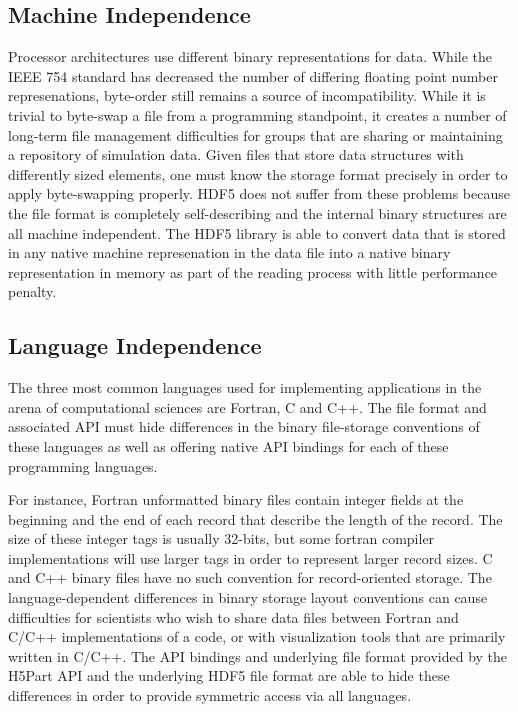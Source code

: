 \documentclass[acus]{JAC2003}
\begin{document}
\subsection{Machine Independence}
Processor architectures use different binary representations
for data.  While the IEEE 754 standard has decreased the number of
differing floating point number represenations, byte-order still remains
a source of incompatibility.  While it is trivial to byte-swap a file from
a programming standpoint, it creates a number of long-term file management
difficulties for groups that are sharing or maintaining a repository of simulation
data.  Given files that store data structures with differently sized elements,
one must know the storage format precisely in order to apply byte-swapping
properly. 
HDF5 does not suffer from these problems because the file format is completely
self-describing and the internal binary structures are all machine independent.
The HDF5 library is able to convert data that is stored in any native machine 
represenation in the data file into a native binary representation in memory 
as part of the reading process with little performance penalty.

\subsection{Language Independence}
The three most common languages used for implementing applications 
in the arena of computational sciences are
Fortran, C and C++. The file format and associated API must hide
differences in the binary file-storage conventions of these languages
as well as offering native API bindings for each of these 
programming languages.

For instance, Fortran unformatted binary files contain integer fields
at the beginning and the end of each record that describe the length
of the record.  The size of these integer tags is usually 32-bits, but some
fortran compiler implementations will use larger tags in order to represent
larger record sizes. C and C++ binary files have no such convention for 
record-oriented storage.  The language-dependent differences in 
binary storage layout conventions
can cause difficulties for scientists who wish to share data files between 
Fortran and C/C++ implementations of a code, or with visualization tools
that are primarily written in C/C++.  The API bindings and underlying file format
provided by the H5Part API and the underlying HDF5 file format are able to
hide these differences in order to provide symmetric access via all languages.
\end{document}
